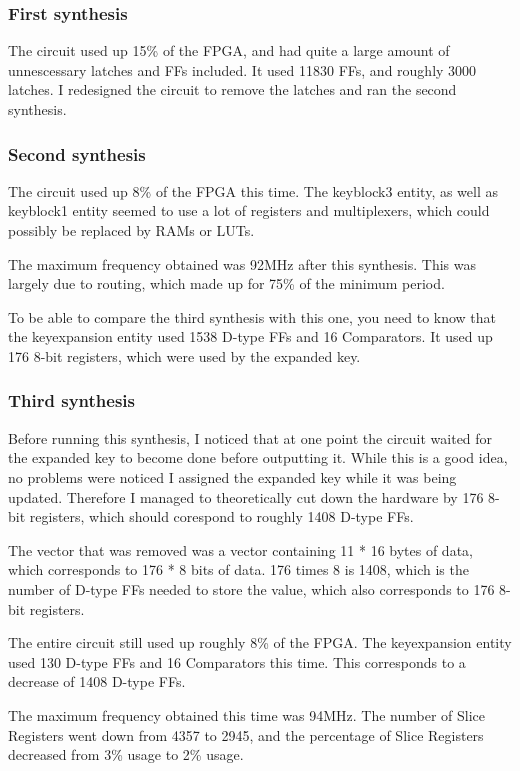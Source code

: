 \subsubsection{First synthesis}
The circuit used up 15\% of the FPGA, and had quite a large amount of 
unnescessary latches and FFs included. It used 11830 FFs, and roughly 
3000 latches. I redesigned the circuit to remove the latches and ran 
the second synthesis.

\subsubsection{Second synthesis}
The circuit used up 8\% of the FPGA this time. The keyblock3 entity, as 
well as keyblock1 entity seemed to use a lot of registers and 
multiplexers, which could possibly be replaced by RAMs or LUTs.

The maximum frequency obtained was 92MHz after this synthesis. This 
was largely due to routing, which made up for 75\% of the minimum 
period.

To be able to compare the third synthesis with this one, you need to 
know that the keyexpansion entity used 1538 D-type FFs and 16 
Comparators. It used up 176 8-bit registers, which were used by the 
expanded key.

\subsubsection{Third synthesis}
Before running this synthesis, I noticed that at one point the circuit 
waited for the expanded key to become done before outputting it. While 
this is a good idea, no problems were noticed I assigned the expanded 
key while it was being updated. Therefore I managed to theoretically 
cut down the hardware by 176 8-bit registers, which should corespond to 
roughly 1408 D-type FFs. 

The vector that was removed was a vector containing 11 * 16 bytes of 
data, which corresponds to 176 * 8 bits of data. 176 times 8 is 1408, 
which is the number of D-type FFs needed to store the value, which 
also corresponds to 176 8-bit registers.

The entire circuit still used up roughly 8\% of the FPGA. The 
keyexpansion entity used 130 D-type FFs and 16 Comparators this 
time. This corresponds to a decrease of 1408 D-type FFs.

The maximum frequency obtained this time was 94MHz. The number of 
Slice Registers went down from 4357 to 2945, and the percentage of 
Slice Registers decreased from 3\% usage to 2\% usage.

